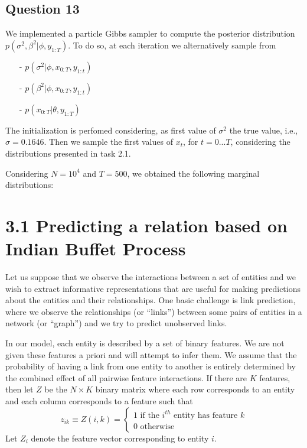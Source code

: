 \documentclass[]{article}
\begin{document}
\subsection*{Question 13}
We implemented a particle Gibbs sampler to compute the posterior distribution $p(\sigma^2, \beta^2|\phi, y_{1:T})$. To do so, at each iteration we alternatively sample from
\begin{enumerate}
	\item[-] $p(\sigma^2|\phi, x_{0:T}, y_{1:t})$
	\item[-] $p(\beta^2|\phi, x_{0:T}, y_{1:t})$
	\item[-] $p(x_{0:T}|\theta, y_{1:T})$
\end{enumerate}
The initialization is perfomed considering, as first value of $\sigma^2$ the true value, i.e., $\sigma = 0.1646$. Then we sample the first values of $x_t$, for $t=0...T$, considering the distributions presented in task 2.1.

Considering $N=10^4$ and $T=500$, we obtained the following marginal distributions:


\newpage

\section*{3.1 Predicting a relation based on Indian Buffet Process}
Let us suppose that we observe the interactions between a set of entities and we wish to extract informative representations that are useful for making predictions about the entities and their relationships. One basic challenge is link prediction, where we observe the relationships (or “links”) between some pairs of entities in a network (or “graph”) and we try to predict unobserved links. 

In our model, each entity is described by a set of binary features. We are not given these features a priori and will attempt to infer them. We assume that the probability of having a link from one entity to another is entirely determined by the combined effect of all pairwise feature interactions. If there are $K$ features, then let $Z$ be the $N \times K$ binary matrix where each row corresponds to an entity and each column corresponds to a feature such that
$$ 
z_{ik} \equiv Z(i,k) = 
\begin{cases}
	1 \text{\ \ \ if the $i^{th}$ entity has feature $k$} \\
	0 \text{\ \ \ otherwise}
\end{cases}
$$
Let $Z_i$ denote the feature vector corresponding to entity $i$.
\end{document}
